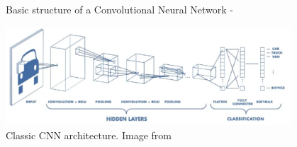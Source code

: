 \begin{frame}[t,allowframebreaks]{Basic structure of a Convolutional Neural Network -}
    \begin{center}
        \includegraphics[width=0.8\textwidth]
          {./images/cnn/basic_structure/chatterjee19_classic_cnn_architecture.png}\\
        {\scriptsize 
          Classic CNN architecture.
          \color{col:attribution} 
          Image from \cite{TowardsDataScience:BasicsOfClassicCNN}}\\    
    \end{center}      
   
\end{frame}

